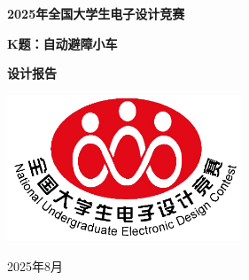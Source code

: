 \documentclass[UTF8]{ctexart}
\begin{document}
	
	\thispagestyle{empty}
	\vspace*{1cm}
	
	\begin{center}
		\vspace{2cm}
		
		{\Huge \bfseries 2025年全国大学生电子设计竞赛}
		
		\vspace{1.5cm}
		
		{\LARGE \bfseries K题：自动避障小车}
		
		\vspace{1cm}
		
		{\huge \bfseries 设计报告}
		
		\vspace{3cm}
		
		
		\includegraphics[width=7cm]{logo.png}
		
		\vspace{2cm}
		
		
		\vspace{2cm}
		
		{\Large 2025年8月}
	\end{center}
	
	\newpage
	
\end{document}
